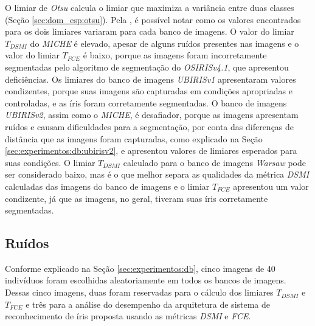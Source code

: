 \par O limiar de \textit{Otsu} calcula o limiar que maximiza a variância entre duas classes (Seção \ref{sec:dom_esp:otsu}). Pela , é possível notar como os valores encontrados para os dois limiares variaram para cada banco de imagens. O valor do limiar $T_{DSMI}$  do \textit{MICHE} é elevado, apesar de alguns ruídos presentes nas imagens e o valor do limiar $T_{FCE}$ é baixo, porque as imagens foram incorretamente segmentadas pelo algoritmo de segmentação do \textit{OSIRISv4.1}, que apresentou deficiências. Os limiares do banco de imagens \textit{UBIRISv1} apresentaram valores condizentes, porque suas imagens são capturadas em condições apropriadas e controladas, e as íris foram corretamente segmentadas. O banco de imagens \textit{UBIRISv2}, assim como o \textit{MICHE}, é desafiador, porque as imagens apresentam ruídos e causam dificuldades para a segmentação, por conta das diferenças de distância que as imagens foram capturadas, como explicado na Seção \ref{sec:experimentos:db:ubirisv2}, e apresentou valores de limiares esperados para suas condições. O limiar $T_{DSMI}$ calculado para o banco de imagens \textit{\acrshort{Warsaw}} pode ser considerado baixo, mas é o que melhor separa as qualidades da métrica \textit{\acrshort{DSMI}} calculadas das imagens do banco de imagens e o limiar $T_{FCE}$ apresentou um valor condizente, já que as imagens, no geral, tiveram suas íris corretamente segmentadas.



\FloatBarrier

\subsection{Ruídos} \label{sec:experimentos:ruidos}

\par Conforme explicado na Seção \ref{sec:experimentos:db}, cinco imagens de 40 indivíduos foram escolhidas aleatoriamente em todos os bancos de imagens. Dessas cinco imagens, duas foram reservadas para o cálculo dos limiares $T_{DSMI}$ e $T_{FCE}$ e três para a análise do desempenho da arquitetura de sistema de reconhecimento de íris proposta usando as métricas \textit{\acrshort{DSMI}} e \textit{\acrshort{FCE}}. 

